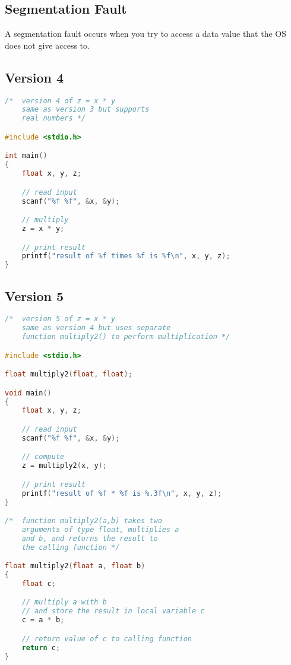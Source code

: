 \documentclass{article}
\begin{document}
\subsection*{Segmentation Fault}
A segmentation fault occurs when you try to access a data value that the OS does not give access to.

\subsection*{Version 4}
\begin{lstlisting}[language=C]
/* 	version 4 of z = x * y
	same as version 3 but supports
	real numbers */

#include <stdio.h>

int main()
{
    float x, y, z;

    // read input
    scanf("%f %f", &x, &y);

    // multiply
    z = x * y;

    // print result
    printf("result of %f times %f is %f\n", x, y, z);
}
\end{lstlisting}

\subsection*{Version 5}
\begin{lstlisting}[language=C]
/* 	version 5 of z = x * y
	same as version 4 but uses separate
	function multiply2() to perform multiplication */

#include <stdio.h>

float multiply2(float, float);

void main()
{
    float x, y, z;

    // read input
    scanf("%f %f", &x, &y);

    // compute
    z = multiply2(x, y);

    // print result
    printf("result of %f * %f is %.3f\n", x, y, z);
}

/*	function multiply2(a,b) takes two
	arguments of type float, multiplies a
	and b, and returns the result to
	the calling function */

float multiply2(float a, float b)
{
    float c;

    // multiply a with b
    // and store the result in local variable c
    c = a * b;

    // return value of c to calling function
    return c;
}
\end{lstlisting}
\end{document}
